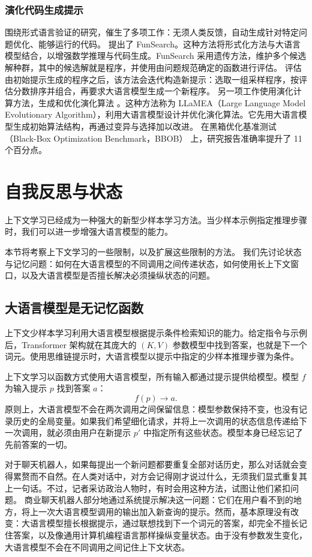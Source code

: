 \subsubsection{演化代码生成提示}
围绕形式语言验证的研究，催生了多项工作：无须人类反馈，自动生成针对特定问题优化、能够运行的代码。
\citet{romera2024mathematical} 提出了 FunSearch。这种方法将形式化方法与大语言模型结合，以增强数学推理与代码生成。FunSearch 采用遗传方法，维护多个候选解种群，其中的候选解就是程序，并使用由问题规范确定的函数进行评估。
评估由初始提示生成的程序之后，该方法会迭代构造新提示：选取一组采样程序，按评估分数排序并组合，再要求大语言模型生成一个新程序。
另一项工作使用演化计算方法，生成和优化演化算法 \citep{van2024llamea}。这种方法称为 LLaMEA（Large Language Model Evolutionary Algorithm），利用大语言模型设计并优化演化算法。它先用大语言模型生成初始算法结构，再通过变异与选择加以改进。
在黑箱优化基准测试（Black-Box Optimization Benchmark，BBOB）\citep{hansen2010black} 上，研究报告准确率提升了 11 个百分点。

\section{自我反思与状态}\label{sec:state}
上下文学习已经成为一种强大的新型少样本学习方法。当少样本示例指定推理步骤时，我们可以进一步增强大语言模型的能力。

本节将考察上下文学习的一些限制，以及扩展这些限制的方法。
我们先讨论状态与记忆问题：如何在大语言模型的不同调用之间传递状态，如何使用长上下文窗口，以及大语言模型是否擅长解决必须操纵状态的问题。

\subsection{大语言模型是无记忆函数}
上下文少样本学习利用大语言模型根据提示条件检索知识的能力。给定指令与示例后，Transformer 架构就在其庞大的 $(K,V)$ 参数模型中找到答案，也就是下一个词元。使用思维链提示时，大语言模型以提示中指定的少样本推理步骤为条件。

上下文学习以函数方式使用大语言模型，所有输入都通过提示提供给模型。模型 $f$ 为输入提示 $p$ 找到答案 $a$：$$f(p)\rightarrow a.$$
原则上，大语言模型不会在两次调用之间保留信息：模型参数保持不变，也没有记录历史的全局变量。如果我们希望细化请求，并将上一次调用的状态信息传递给下一次调用，就必须由用户在新提示 $p'$ 中指定所有这些状态。模型本身已经忘记了先前答案的一切。

对于聊天机器人，如果每提出一个新问题都要重复全部对话历史，那么对话就会变得累赘而不自然。在人类对话中，对方会记得刚才说过什么，无须我们显式重复其上一句话。不过，记者采访政治人物时，有时会用这种方法，试图让他们紧扣问题。
商业聊天机器人部分地通过系统提示解决这一问题：它们在用户看不到的地方，将上一次大语言模型调用的输出加入新查询的提示。然而，基本原理没有改变：大语言模型擅长根据提示，通过联想找到下一个词元的答案，却完全不擅长记住答案，以及像通用计算机编程语言那样操纵变量状态。由于没有参数发生变化，大语言模型不会在不同调用之间记住上下文状态。

